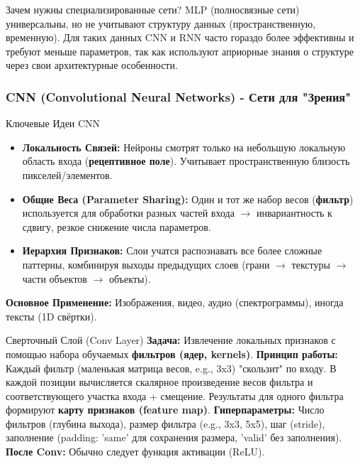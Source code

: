 \begin{textbox}{Зачем нужны специализированные сети?}
    MLP (полносвязные сети) универсальны, но не учитывают структуру данных (пространственную, временную). Для таких данных CNN и RNN часто гораздо более эффективны и требуют меньше параметров, так как используют априорные знания о структуре через свои архитектурные особенности.
\end{textbox}

\subsubsection{CNN (Convolutional Neural Networks) - Сети для "Зрения"}
\begin{myblock}{Ключевые Идеи CNN}
    \begin{itemize}[nosep, leftmargin=*]
        \item \textbf{Локальность Связей:} Нейроны смотрят только на небольшую локальную область входа (\textbf{рецептивное поле}). Учитывает пространственную близость пикселей/элементов.
        \item \textbf{Общие Веса (Parameter Sharing):} Один и тот же набор весов (\textbf{фильтр}) используется для обработки разных частей входа $\rightarrow$ инвариантность к сдвигу, резкое снижение числа параметров.
        \item \textbf{Иерархия Признаков:} Слои учатся распознавать все более сложные паттерны, комбинируя выходы предыдущих слоев (грани $\rightarrow$ текстуры $\rightarrow$ части объектов $\rightarrow$ объекты).
    \end{itemize}
    \textbf{Основное Применение:} Изображения, видео, аудио (спектрограммы), иногда тексты (1D свёртки).
\end{myblock}

\begin{myexampleblock}{Сверточный Слой (Conv Layer)}
    \textbf{Задача:} Извлечение локальных признаков с помощью набора обучаемых \textbf{фильтров (ядер, kernels)}.
    \textbf{Принцип работы:} Каждый фильтр (маленькая матрица весов, e.g., 3x3) "скользит" по входу. В каждой позиции вычисляется скалярное произведение весов фильтра и соответствующего участка входа + смещение. Результаты для одного фильтра формируют \textbf{карту признаков (feature map)}.
    \textbf{Гиперпараметры:} Число фильтров (глубина выхода), размер фильтра (e.g., 3x3, 5x5), шаг (stride), заполнение (padding: 'same' для сохранения размера, 'valid' без заполнения).
    \textbf{После Conv:} Обычно следует функция активации (ReLU).
\end{myexampleblock}

